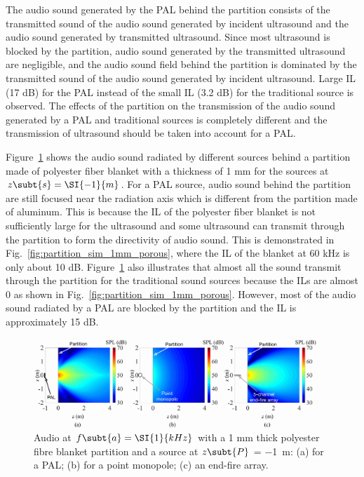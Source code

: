 The audio sound generated by the PAL behind the partition consists of the transmitted sound of the audio sound generated by incident ultrasound and the audio sound generated by transmitted ultrasound. 
Since most ultrasound is blocked by the partition, audio sound generated by the transmitted ultrasound are negligible, and the audio sound field behind the partition is dominated by the transmitted sound of the audio sound generated by incident ultrasound. 
Large IL (17 dB) for the PAL instead of the small IL (3.2 dB) for the traditional source is observed. 
The effects of the partition on the transmission of the audio sound generated by a PAL and traditional sources is completely different and the transmission of ultrasound should be taken into account for a PAL.

Figure~\ref{fig:partition_sim_1mm} shows the audio sound radiated by different sources behind a partition made of polyester fiber blanket with a thickness of 1 mm for the sources at $z\subt{s} = \SI{-1 }{m}$. 
For a PAL source, audio sound behind the partition are still focused near the radiation axis which is different from the partition made of aluminum. 
This is because the IL of the polyester fiber blanket is not sufficiently large for the ultrasound and some ultrasound can transmit through the partition to form the directivity of audio sound. 
This is demonstrated in Fig.~\ref{fig:partition_sim_1mm_porous}, where the IL of the blanket at 60 kHz is only about 10 dB. 
Figure~\ref{fig:partition_sim_1mm} also illustrates that almost all the sound transmit through the partition for the traditional sound sources because the ILs are almost 0 as shown in Fig.~\ref{fig:partition_sim_1mm_porous}. 
However, most of the audio sound radiated by a PAL are blocked by the partition and the IL is approximately 15 dB.

\begin{figure}[!htb]
    \centering
    \includegraphics[width = 0.95\textwidth]{Figures/pending/porous_thick1mm_zPal1m_190922A_200605}
    \caption{Audio  at $f\subt{a} = \SI{1}{kHz}$ with a 1 mm thick polyester fibre blanket partition and a source at $z\subt{P}$ = \SI{-1}{m}: (a) for a PAL; (b) for a point monopole; (c) an end-fire array.}
    \label{fig:partition_sim_1mm}
\end{figure}

